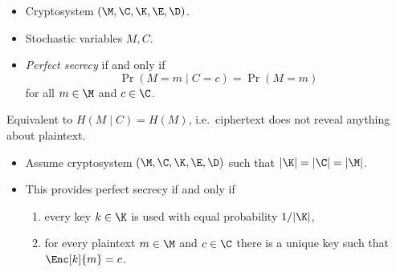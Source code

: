 \begin{frame}
  \begin{definition}
    \begin{itemize}
      \item Cryptosystem \((\M, \C, \K, \E, \D)\).
      \item Stochastic variables \(M, C\).
      \item \emph{Perfect secrecy} if and only if \[\Pr(M = m\mid C = c) 
          = \Pr(M = m)\] for all \(m\in \M\) and \(c\in \C\).
    \end{itemize}
  \end{definition}

  \pause{}

  \begin{remark}
    Equivalent to \(H(M\mid C) = H(M)\), i.e.\ ciphertext does not reveal 
    anything about plaintext.
  \end{remark}
\end{frame}

\begin{frame}
  \begin{theorem}
    \begin{itemize}
      \item Assume cryptosystem \((\M, \C, \K, \E, \D)\) such that \(|\K| 
          = |\C| = |\M|\).

        \pause{}

      \item This provides perfect secrecy if and only if
        \begin{enumerate}
          \item every key \(k\in \K\) is used with equal probability 
            \(1/|\K|\),
          \item for every plaintext \(m\in \M\) and \(c\in \C\) there is 
            a unique key such that \(\Enc[k]{m} = c\).
        \end{enumerate}
    \end{itemize}
  \end{theorem}
\end{frame}

